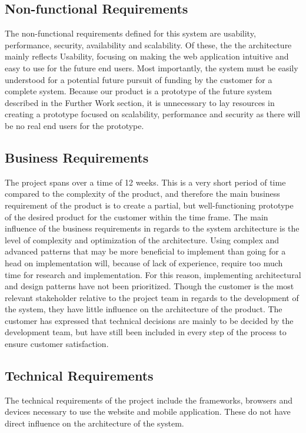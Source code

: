 \subsection{Non-functional Requirements}
\label{subsec:ArchDriversNonfunctional}
The non-functional requirements defined for this system are usability, performance, security, availability and scalability. Of these, the the architecture mainly reflects Usability, focusing on making the web application intuitive and easy to use for the future end users. Most importantly, the system must be easily understood for a potential future pursuit of funding by the customer for a complete system. Because our product is a prototype of the future system described in the Further Work section, it is unnecessary to lay resources in creating a prototype focused on scalability, performance and security as there will be no real end users for the prototype.

\subsection{Business Requirements}
\label{subsec:ArchDriversBusiness}
The project spans over a time of 12 weeks. This is a very short period of time compared to the complexity of the product, and therefore the main business requirement of the product is to create a partial, but well-functioning prototype of the desired product for the customer within the time frame. The main influence of the business requirements in regards to the system architecture is the level of complexity and optimization of the architecture. Using complex and advanced patterns that may be more beneficial to implement than going for a head on implementation will, because of lack of experience, require too much time for research and implementation. For this reason, implementing architectural and design patterns have not been prioritized. Though the customer is the most relevant stakeholder relative to the project team in regards to the development of the system, they have little influence on the architecture of the product. The customer has expressed that technical decisions are mainly to be decided by the development team, but have still been included in every step of the process to ensure customer satisfaction.

\subsection{Technical Requirements}
\label{subsec:ArchDriversTechnical}
The technical requirements of the project include the frameworks, browsers and devices necessary to use the website and mobile application. These do not have direct influence on the architecture of the system. 


